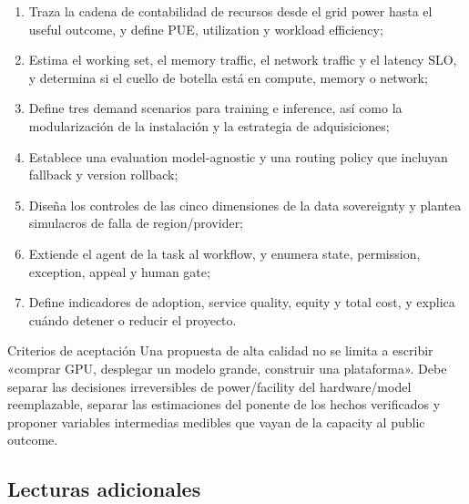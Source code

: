 \documentclass[a4paper]{article}
\begin{document}
\begin{enumerate}
  \item Traza la cadena de contabilidad de recursos desde el grid power hasta el useful outcome, y define PUE, utilization y workload efficiency;
  \item Estima el working set, el memory traffic, el network traffic y el latency SLO, y determina si el cuello de botella está en compute, memory o network;
  \item Define tres demand scenarios para training e inference, así como la modularización de la instalación y la estrategia de adquisiciones;
  \item Establece una evaluation model-agnostic y una routing policy que incluyan fallback y version rollback;
  \item Diseña los controles de las cinco dimensiones de la data sovereignty y plantea simulacros de falla de region/provider;
  \item Extiende el agent de la task al workflow, y enumera state, permission, exception, appeal y human gate;
  \item Define indicadores de adoption, service quality, equity y total cost, y explica cuándo detener o reducir el proyecto.
\end{enumerate}

\begin{knowledgebox}{Criterios de aceptación}
Una propuesta de alta calidad no se limita a escribir «comprar GPU, desplegar un modelo grande, construir una plataforma». Debe separar las decisiones irreversibles de power/facility del hardware/model reemplazable, separar las estimaciones del ponente de los hechos verificados y proponer variables intermedias medibles que vayan de la capacity al public outcome.
\end{knowledgebox}

\subsection{Lecturas adicionales}
\end{document}
